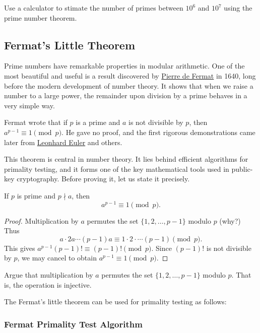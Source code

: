 \begin{exercise}
Use a calculator to stimate the number of primes between $10^6$ and $10^7$ using the prime number theorem.
\end{exercise}


\subsection{Fermat’s Little Theorem}

Prime numbers have remarkable properties in modular arithmetic. 
One of the most beautiful and useful is a result discovered by \href{https://en.wikipedia.org/wiki/Pierre\_de\_Fermat}{Pierre de Fermat} in 1640, 
long before the modern development of number theory. 
It shows that when we raise a number to a large power, the remainder upon division by a prime 
behaves in a very simple way.

Fermat wrote that if $p$ is a prime and $a$ is not divisible by $p$, then
$a^{p-1} \equiv 1 \pmod p$. 
He gave no proof, and the first rigorous demonstrations came later from \href{https://en.wikipedia.org/wiki/Leonhard\_Euler}{Leonhard Euler} and others.

This theorem is central in number theory. 
It lies behind efficient algorithms for primality testing, 
and it forms one of the key mathematical tools used in public-key cryptography.
Before proving it, let us state it precisely.
\begin{theorem}
\label{thm:fermat}
If $p$ is prime and $p\nmid a$, then
\[
a^{p-1}\equiv 1 \pmod p.
\]
\end{theorem}
\begin{proof}
Multiplication by $a$ permutes the set $\{1,2,\dots,p-1\}$ modulo $p$ (why?)
Thus
\[
a\cdot 2a\cdots (p-1)a \equiv 1\cdot 2\cdot \cdots (p-1) \pmod p.
\]
This gives $a^{p-1}(p-1)!\equiv (p-1)! \pmod p$. Since $(p-1)!$ is not divisible by $p$, we may cancel to obtain $a^{p-1}\equiv 1 \pmod p$.
\end{proof}

\begin{exercise}
Argue that multiplication by $a$  permutes the set $\{1,2,\dots,p-1\}$ modulo $p$. That is, the operation is injective.
\end{exercise}


The Fermat's little theorem  can be used for primality testing as follows:

\subsubsection*{Fermat Primality Test Algorithm}


